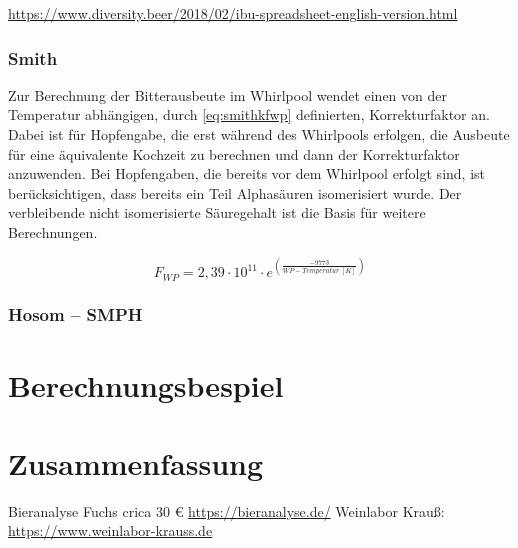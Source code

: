 \documentclass[a4paper,parskip=half]{scrartcl}
\begin{document}
\url{https://www.diversity.beer/2018/02/ibu-spreadsheet-english-version.html}
\parencite{Novotny2016}
\parencite{Novotny2018}

\subsubsection*{Smith}

Zur Berechnung der Bitterausbeute im Whirlpool wendet \citeauthor{Smith2019}
einen von der Temperatur abhängigen, durch \autoref{eq:smithkfwp} definierten,
Korrekturfaktor an. Dabei ist für Hopfengabe, die erst während des Whirlpools
erfolgen, die Ausbeute für eine äquivalente Kochzeit zu berechnen und dann der
Korrekturfaktor anzuwenden. Bei Hopfengaben, die bereits vor dem Whirlpool erfolgt
sind, ist berücksichtigen, dass bereits ein Teil Alphasäuren isomerisiert wurde.
Der verbleibende nicht isomerisierte Säuregehalt ist die Basis für weitere
Berechnungen. \parencite{Smith2019}

\begin{equation}
\mathit{F}_{\mathit{WP}} = 2,39 \cdot 10^{11} \cdot e^{\left(\frac{-9773}{\mathit{WP-Temperatur}\:[K]} \right)}
\label{eq:smithkfwp}
\end{equation}

\subsubsection*{Hosom – SMPH}

\parencite{Hosom2021}

\section*{Berechnungsbespiel}

\section*{Zusammenfassung}

\parencite{Janish2019}
\parencite{Hieronymus2012}
\parencite{Nottebohm2020}
\parencite{Pyle1995}
\parencite{Justus2018}
\parencite{Parkin2017}
\parencite{Bishop1964}
\parencite{Nickerson1979}
\parencite{Calado2019}
\parencite{Weiss2019}

\parencite{Bruecklmeier2017}
\parencite{Bruecklmeier2018}

Bieranalyse Fuchs crica 30 € \url{https://bieranalyse.de/}
Weinlabor Krauß: \url{https://www.weinlabor-krauss.de}

\printbibliography[title=Quellen]
\end{document}
